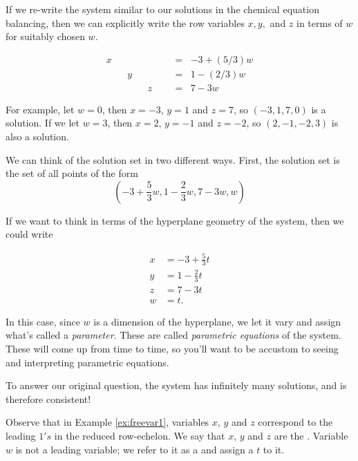 \documentclass{ximera}
\begin{document}
\begin{example}
If we re-write the system similar to our solutions in the chemical equation balancing, then we can explicitly write the row variables $x, y, $ and $z$ in terms of $w$ for suitably chosen $w$.

 $$\begin{array}{ccccccccc}
      x & &&&&&&= &-3+(5/3)w \\
     & &y&&&&&=&1-(2/3)w\\
     & &&&z&&&=&7-3w
    \end{array}$$

For example, let $w=0$, then $x=-3$, $y=1$ and $z=7$, so $(-3, 1, 7, 0)$ is a solution.  If we let $w=3$, then $x=2$, $y=-1$ and $z=-2$, so $(2, -1, -2, 3)$ is also a solution.

  We can think of the solution set in two different ways.  First, the solution set is the set of all points of the form$$\left(-3+\frac{5}{3}w, 1-\frac{2}{3}w, 7-3w, w\right)$$
  
If we want to think in terms of the hyperplane geometry of the system, then we could write 

 \begin{align*}
 x&=-3+\frac{5}{3}t\\
 y&=1-\frac{2}{3}t\\
 z&=7-3t\\
 w&=t.
 \end{align*}

 In this case, since $w$ is a dimension of the hyperplane, we let it vary and assign what's called a \emph{parameter}. These are called \emph{parametric equations} of the system. These will come up from time to time, so you'll want to be accustom to seeing and interpreting parametric equations.

To answer our original question, the system has infinitely many solutions, and is therefore consistent!
 
\end{example}
 
Observe that in Example \ref{ex:freevar1}, variables $x$, $y$ and $z$ correspond to the leading $1's$ in the reduced row-echelon.  We say that $x$, $y$ and $z$ are the .  Variable $w$ is not a leading variable; we refer to it as a  and assign a  $t$ to it.
 
\end{document}
